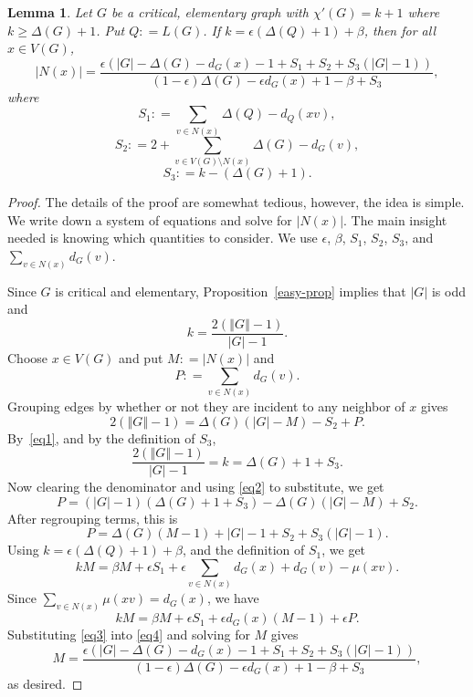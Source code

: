 \documentclass[12pt]{article}
\theoremstyle{plain}
\newtheorem{lem}[thm]{Lemma}
\theoremstyle{definition}
\theoremstyle{remark}
\newcommand{\card}[1]{\left|#1\right|}
\newcommand{\size}[1]{\left\Vert#1\right\Vert}
\newcommand{\parens}[1]{\left( #1 \right)}
\newcommand{\DefinedAs}{\mathrel{\mathop:}=}
\begin{document}
\begin{lem}
\label{Slacked}
Let $G$ be a critical, elementary graph with $\chi'(G) = k + 1$ where $k \ge \Delta(G) + 1$.  Put $Q \DefinedAs L(G)$.  
If $k = \epsilon\parens{\Delta(Q) + 1} + \beta$, then for all $x \in V(G)$,
\[\card{N(x)} = \frac{\epsilon\parens{\card{G} - \Delta(G) - d_G(x) - 1 + S_1 + S_2 + S_3\parens{\card{G} - 1}}}{(1-\epsilon)\Delta(G) - \epsilon d_G(x) + 1 - \beta + S_3},\]
where 
\[S_1 \DefinedAs \sum_{v \in N(x)} \Delta(Q) - d_Q(xv),\]
\[S_2 \DefinedAs 2 + \sum_{v \in V(G) \setminus N(x)} \Delta(G) - d_G(v),\]
\[S_3 \DefinedAs k - (\Delta(G) + 1).\]
\end{lem}
\begin{proof}
The details of the proof are somewhat tedious, however, the idea is simple.  We
write down a system of equations and solve for $\card{N(x)}$.  The main
insight needed is knowing which quantities to consider.  We use $\epsilon$,
$\beta$, $S_1$, $S_2$, $S_3$, and $\sum_{v\in N(x)}d_G(v)$.

Since $G$ is critical and elementary, Proposition~\ref{easy-prop} implies that
$\card{G}$ is odd and
\begin{equation}
\label{eq1}
k = \frac{2(\size{G} - 1)}{\card{G} - 1}.
\end{equation}
Choose $x \in V(G)$ and put $M \DefinedAs \card{N(x)}$ and 
\[P \DefinedAs \sum_{v \in N(x)} d_G(v).\] 
Grouping edges by whether or not they are incident to any neighbor of $x$ gives
\begin{equation}\label{eq2}
2(\size{G} - 1) = \Delta(G)(\card{G} - M) - S_2 + P.
\end{equation}
By~\eqref{eq1}, and by the definition of $S_3$,
\[\frac{2(\size{G} - 1)}{\card{G} - 1} = k = \Delta(G) + 1 + S_3.\]
Now clearing the denominator and using \eqref{eq2} to substitute, we get
\[P = (\card{G} - 1)(\Delta(G) + 1 + S_3) - \Delta(G)(\card{G} - M) + S_2.\]
After regrouping terms, this is
\begin{equation}\label{eq3}
P = \Delta(G)(M-1) + \card{G} - 1 + S_2 + S_3(\card{G} - 1).
\end{equation}
Using $k = \epsilon\parens{\Delta(Q) + 1} + \beta$, and the definition of $S_1$, we get
\[kM = \beta M + \epsilon S_1 + \epsilon\sum_{v \in N(x)} d_G(x) + d_G(v) - \mu(xv).\]
Since $\sum_{v \in N(x)} \mu(xv) = d_G(x)$, we have
\begin{equation}\label{eq4}
kM = \beta M + \epsilon S_1 + \epsilon d_G(x)(M - 1) + \epsilon P.
\end{equation}
Substituting \eqref{eq3} into \eqref{eq4} and solving for $M$ gives
\[M= \frac{\epsilon\parens{\card{G} - \Delta(G) - d_G(x) - 1 + S_1 + S_2 + S_3\parens{\card{G} - 1}}}{(1-\epsilon)\Delta(G) - \epsilon d_G(x) + 1 - \beta + S_3},\]
as desired.
\end{proof}
\end{document}
